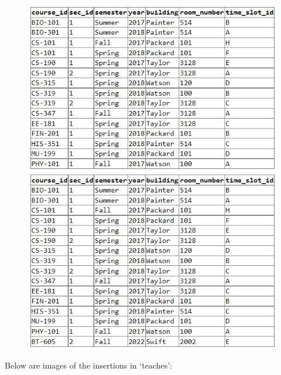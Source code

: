 \documentclass{article}
\begin{document}
\begin{figure}[!hbt]
    \centering
    \includegraphics[scale=0.77]{pics/insert-pic5.jpg}
    \label{fig:ins5}
\end{figure} \newpage \noindent
Below are images of the insertions in `teaches':
\end{document}
